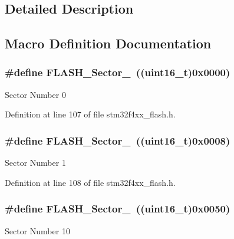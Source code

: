 \subsection{Detailed Description}


\subsection{Macro Definition Documentation}
\hypertarget{group___f_l_a_s_h___sectors_gac0f2d85ff047a3bf5dcdcd275e488796}{
\subsubsection[{F\-L\-A\-S\-H\-\_\-\-Sector\-\_\-0}]{\setlength{\rightskip}{0pt plus 5cm}\#define F\-L\-A\-S\-H\-\_\-\-Sector\-\_~((uint16\-\_\-t)0x0000)}}\label{group___f_l_a_s_h___sectors_gac0f2d85ff047a3bf5dcdcd275e488796}
Sector Number 0 

Definition at line 107 of file stm32f4xx\-\_\-flash.\-h.

\hypertarget{group___f_l_a_s_h___sectors_ga64fa0a3c29717df67d2fa827cc316faa}{
\subsubsection[{F\-L\-A\-S\-H\-\_\-\-Sector\-\_\-1}]{\setlength{\rightskip}{0pt plus 5cm}\#define F\-L\-A\-S\-H\-\_\-\-Sector\-\_~((uint16\-\_\-t)0x0008)}}\label{group___f_l_a_s_h___sectors_ga64fa0a3c29717df67d2fa827cc316faa}
Sector Number 1 

Definition at line 108 of file stm32f4xx\-\_\-flash.\-h.

\hypertarget{group___f_l_a_s_h___sectors_ga0f9450aee4976ecf4f0ba2fbcf2555be}{
\subsubsection[{F\-L\-A\-S\-H\-\_\-\-Sector\-\_\-10}]{\setlength{\rightskip}{0pt plus 5cm}\#define F\-L\-A\-S\-H\-\_\-\-Sector\-\_~((uint16\-\_\-t)0x0050)}}\label{group___f_l_a_s_h___sectors_ga0f9450aee4976ecf4f0ba2fbcf2555be}
Sector Number 10 

